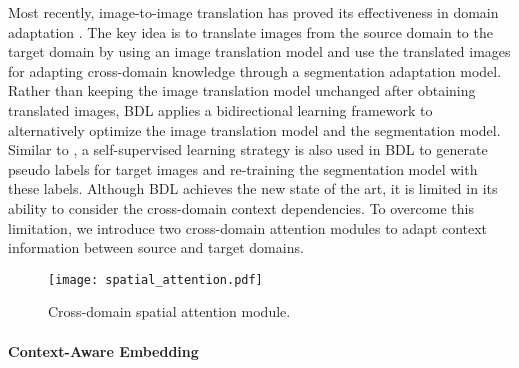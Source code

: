 \documentclass[10pt,twocolumn,letterpaper]{article}
\begin{document}
	Most recently, image-to-image translation \cite{zhu2017unpaired} has proved its effectiveness in domain adaptation \cite{hoffman2017cycada, wu2018dcan, chen2019crdoco}. The key idea is to translate images from the source domain to the target domain by using an image translation model and use the translated images for adapting cross-domain knowledge through a segmentation adaptation model. Rather than keeping the image translation model unchanged after obtaining translated images, BDL \cite{li2019bidirectional} applies a bidirectional learning framework to alternatively optimize the image translation model and the segmentation model. Similar to \cite{zou2018unsupervised}, a self-supervised learning strategy is also used in BDL to generate pseudo labels for target images and re-training the segmentation model with these labels. Although BDL achieves the new state of the art, it is limited in its ability to consider the cross-domain context dependencies. To overcome this limitation, we introduce two cross-domain attention modules to adapt context information between source and target domains.

	\begin{figure}[t]
		\begin{center}
			\texttt{[image: spatial\_attention.pdf]}
		\end{center}
		\caption{Cross-domain spatial attention module.}
		\label{fig:spatial_attention}
		\vspace{-0.2in}
	\end{figure}


	\paragraph{Context-Aware Embedding}
\end{document}
